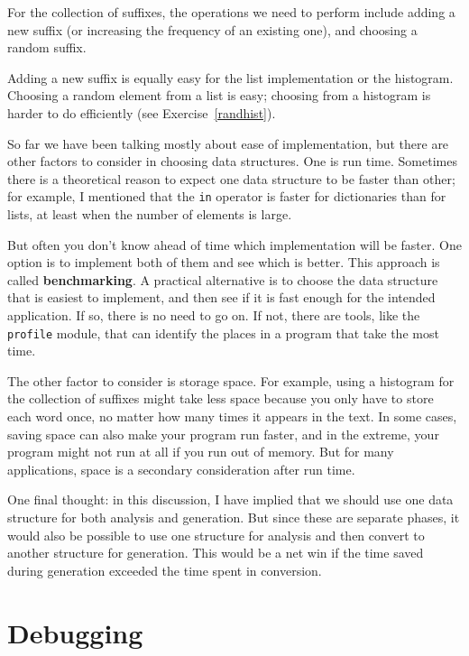 \documentclass[10pt]{book}
\begin{document}
For the collection of suffixes, the operations we need to
perform include adding a new suffix (or increasing the frequency
of an existing one), and choosing a random suffix.

Adding a new suffix is equally easy for the list implementation
or the histogram.  Choosing a random element from a list
is easy; choosing from a histogram is harder to do
efficiently (see Exercise~\ref{randhist}).

So far we have been talking mostly about ease of implementation,
but there are other factors to consider in choosing data structures.
One is run time.  Sometimes there is a theoretical reason to expect
one data structure to be faster than other; for example, I mentioned
that the {\tt in} operator is faster for dictionaries than for lists,
at least when the number of elements is large.

But often you don't know ahead of time which implementation will
be faster.  One option is to implement both of them and see which
is better.  This approach is called {\bf benchmarking}.  A practical
alternative is to choose the data structure that is
easiest to implement, and then see if it is fast enough for the
intended application.  If so, there is no need to go on.  If not,
there are tools, like the {\tt profile} module, that can identify
the places in a program that take the most time.


The other factor to consider is storage space.  For example, using a
histogram for the collection of suffixes might take less space because
you only have to store each word once, no matter how many times it
appears in the text.  In some cases, saving space can also make your
program run faster, and in the extreme, your program might not run at
all if you run out of memory.  But for many applications, space is a
secondary consideration after run time.

One final thought: in this discussion, I have implied that
we should use one data structure for both analysis and generation.  But
since these are separate phases, it would also be possible to use one
structure for analysis and then convert to another structure for
generation.  This would be a net win if the time saved during
generation exceeded the time spent in conversion.


\section{Debugging}
\end{document}
